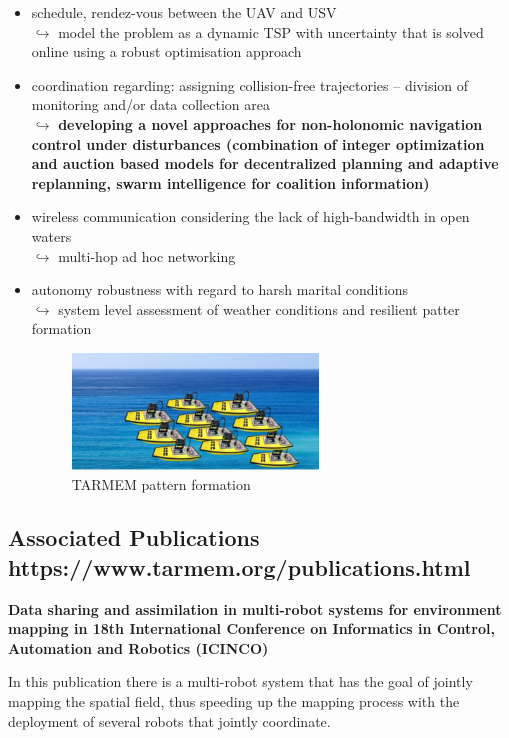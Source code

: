 \documentclass{article}
\begin{document}
\begin{itemize}
	\item schedule, rendez-vous between the UAV and USV \\
	$\hookrightarrow$ model the problem as a dynamic TSP with uncertainty that is solved online using a robust optimisation approach
	\item coordination regarding: assigning collision-free trajectories -- division of monitoring and/or data collection area \\
	$\hookrightarrow$ \textbf{developing a novel approaches for non-holonomic navigation control under disturbances (combination of integer optimization and auction based models for decentralized planning and adaptive replanning, swarm intelligence for coalition information)}
	\item wireless communication considering the lack of high-bandwidth in open waters \\
	$\hookrightarrow$ multi-hop ad hoc networking 
	\item autonomy robustness with regard to harsh marital conditions \\
	$\hookrightarrow$ system level assessment of weather conditions and resilient patter formation  
	
	\begin{figure}[htbp]
		\centerline{\includegraphics[scale=1]{tarmem-pattern-formation.png}}
		\caption{TARMEM pattern formation}
		\label{fig5}
	\end{figure}
	
\end{itemize} 

\subsection{Associated Publications https://www.tarmem.org/publications.html}

\textbf{Data sharing and assimilation in multi-robot systems for environment mapping in 18th International Conference on Informatics in Control, Automation and Robotics (ICINCO)}
 
In this publication there is a multi-robot system that has the goal of jointly mapping the spatial field, thus speeding up the mapping process with the deployment of several robots that jointly coordinate.  
\end{document}
